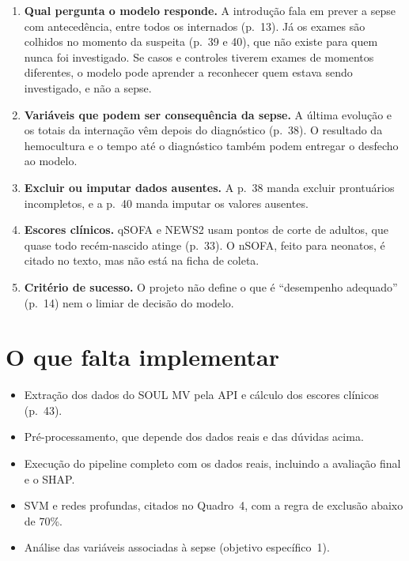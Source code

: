 \documentclass[11pt,a4paper]{article}
\begin{document}
\begin{enumerate}
\item \textbf{Qual pergunta o modelo responde.} A introdução fala em prever a sepse com antecedência, entre todos os
internados (p.~13). Já os exames são colhidos no momento da suspeita (p.~39 e 40), que não existe para quem nunca foi
investigado. Se casos e controles tiverem exames de momentos diferentes, o modelo pode aprender a reconhecer quem
estava sendo investigado, e não a sepse.
\item \textbf{Variáveis que podem ser consequência da sepse.} A última evolução e os totais da internação vêm depois do
diagnóstico (p.~38). O resultado da hemocultura e o tempo até o diagnóstico também podem entregar o desfecho ao modelo.
\item \textbf{Excluir ou imputar dados ausentes.} A p.~38 manda excluir prontuários incompletos, e a p.~40 manda
imputar os valores ausentes.
\item \textbf{Escores clínicos.} qSOFA e NEWS2 usam pontos de corte de adultos, que quase todo recém-nascido atinge
(p.~33). O nSOFA, feito para neonatos, é citado no texto, mas não está na ficha de coleta.
\item \textbf{Critério de sucesso.} O projeto não define o que é ``desempenho adequado'' (p.~14) nem o limiar de
decisão do modelo.
\end{enumerate}

\section{O que falta implementar}

\begin{itemize}
\item Extração dos dados do SOUL MV pela API e cálculo dos escores clínicos (p.~43).
\item Pré-processamento, que depende dos dados reais e das dúvidas acima.
\item Execução do pipeline completo com os dados reais, incluindo a avaliação final e o SHAP.
\item SVM e redes profundas, citados no Quadro~4, com a regra de exclusão abaixo de 70\%.
\item Análise das variáveis associadas à sepse (objetivo específico~1).
\end{itemize}

\end{document}
